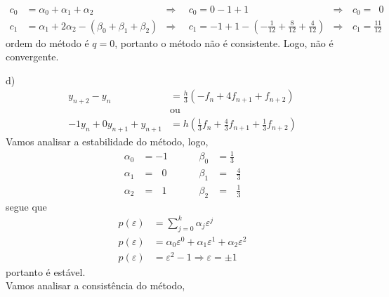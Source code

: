 \documentclass[a4paper,12pt]{article}
\begin{document}
	\begin{align*}
		c_{0} &= \alpha_{0} + \alpha_{1} + \alpha_{2} &\Rightarrow \hspace{6pt} &c_{0} = 0 -1 + 1 &\Rightarrow
		\hspace{2pt} &c_{0} =
		\hspace{6pt}0\\
		c_{1} &= \alpha_{1} + 2\alpha_{2} -(\beta_{0} + \beta_{1} + \beta_{2}) &\Rightarrow \hspace{6pt} &c_{1} = -1 +
		1 - (-\frac{1}{12} + \frac{8}{12} + \frac{4}{12}) &\Rightarrow \hspace{2pt} &c_{1} = \frac{11}{12}
	\end{align*}
ordem do m\'etodo \'e $q = 0$, portanto o m\'etodo n\~ao \'e consistente. Logo, n\~ao \'e convergente. 

d)
	\begin{align*}
		y_{n+2} - y_{n} &= \frac{h}{3}(-f_{n} + 4f_{n+1} + f_{n+2})\\
		&\mbox{ou}\\
		-1y_{n} + 0y_{n+1} + y_{n+1} &= h(\frac{1}{3}f_{n} + \frac{4}{3}f_{n+1} + \frac{1}{3}f_{n+2})
	\end{align*}
Vamos analisar a estabilidade do m\'etodo,
logo,
	\begin{align*}
		\alpha_{0} &= -1 \hspace{1cm}& \beta_{0} &= \frac{1}{3}\\
		\alpha_{1} &=\hspace{8pt} 0 \hspace{1cm}& \beta_{1} &= \hspace{8pt} \frac{4}{3}\\
		\alpha_{2} &=\hspace{8pt} 1 \hspace{1cm}& \beta_{2} &= \hspace{8pt} \frac{1}{3}
	\end{align*}
segue que
	\begin{align*}
		p(\varepsilon) &= \sum_{j=0}^{k}\alpha_{j}\varepsilon^{j} \\
		p(\varepsilon) &= \alpha_{0}\varepsilon^{0} + \alpha_{1}\varepsilon^{1} + \alpha_{2}\varepsilon^{2}\\
		p(\varepsilon) &= \varepsilon^{2} -1 \Rightarrow \varepsilon = \pm 1
	\end{align*}
portanto \'e est\'avel.\\
Vamos analisar a consist\^encia do m\'etodo,
\end{document}

